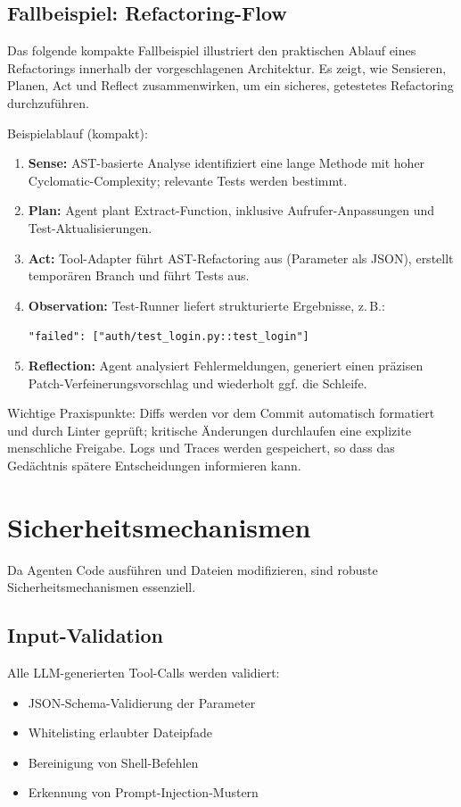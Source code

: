 \subsection{Fallbeispiel: Refactoring-Flow}

Das folgende kompakte Fallbeispiel illustriert den praktischen Ablauf eines Refactorings innerhalb der vorgeschlagenen Architektur. Es zeigt, wie Sensieren, Planen, Act und Reflect zusammenwirken, um ein sicheres, getestetes Refactoring durchzuführen.

Beispielablauf (kompakt):
\begin{enumerate}
  \item \textbf{Sense:} AST-basierte Analyse identifiziert eine lange Methode mit hoher Cyclomatic-Complexity; relevante Tests werden bestimmt.
  \item \textbf{Plan:} Agent plant Extract-Function, inklusive Aufrufer-Anpassungen und Test-Aktualisierungen.
  \item \textbf{Act:} Tool-Adapter führt AST-Refactoring aus (Parameter als JSON), erstellt temporären Branch und führt Tests aus.
  \item \textbf{Observation:} Test-Runner liefert strukturierte Ergebnisse, z.\,B.:
  
  \texttt{"failed": ["auth/test\_login.py::test\_login"]}
  \item \textbf{Reflection:} Agent analysiert Fehlermeldungen, generiert einen präzisen Patch-Verfeinerungsvorschlag und wiederholt ggf. die Schleife.
\end{enumerate}

Wichtige Praxispunkte: Diffs werden vor dem Commit automatisch formatiert und durch Linter geprüft; kritische Änderungen durchlaufen eine explizite menschliche Freigabe. Logs und Traces werden gespeichert, so dass das Gedächtnis spätere Entscheidungen informieren kann.

\section{Sicherheitsmechanismen}

Da Agenten Code ausführen und Dateien modifizieren, sind robuste Sicherheitsmechanismen essenziell.

\subsection{Input-Validation}

Alle LLM-generierten Tool-Calls werden validiert:
\begin{itemize}
  \item JSON-Schema-Validierung der Parameter
  \item Whitelisting erlaubter Dateipfade
  \item Bereinigung von Shell-Befehlen
  \item Erkennung von Prompt-Injection-Mustern
\end{itemize}

